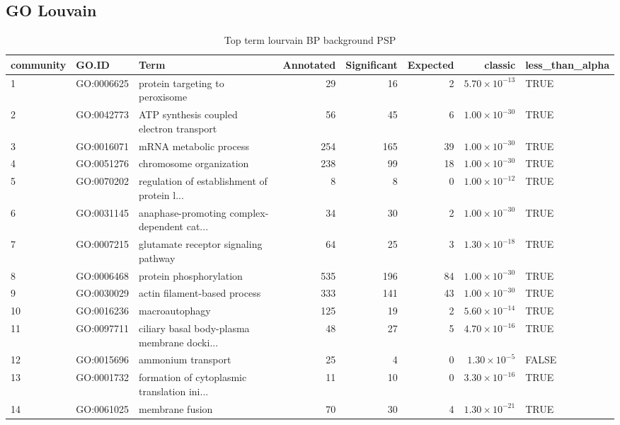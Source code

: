 \subsection{GO Louvain}
\begin{table}[ht]
\centering
\begin{adjustbox}{max width=\textwidth}
\begin{tabular}{lllrrrrl}
  \hline
community & GO.ID & Term & Annotated & Significant & Expected & classic & less\_than\_alpha \\ 
  \hline
1 & GO:0006625 & protein targeting to peroxisome & 29 & 16 & 2 & $5.70 \times 10^{-13}$ & TRUE \\ 
  2 & GO:0042773 & ATP synthesis coupled electron transport & 56 & 45 & 6 & $1.00 \times 10^{-30}$ & TRUE \\ 
  3 & GO:0016071 & mRNA metabolic process & 254 & 165 & 39 & $1.00 \times 10^{-30}$ & TRUE \\ 
  4 & GO:0051276 & chromosome organization & 238 & 99 & 18 & $1.00 \times 10^{-30}$ & TRUE \\ 
  5 & GO:0070202 & regulation of establishment of protein l... & 8 & 8 & 0 & $1.00 \times 10^{-12}$ & TRUE \\ 
  6 & GO:0031145 & anaphase-promoting complex-dependent cat... & 34 & 30 & 2 & $1.00 \times 10^{-30}$ & TRUE \\ 
  7 & GO:0007215 & glutamate receptor signaling pathway & 64 & 25 & 3 & $1.30 \times 10^{-18}$ & TRUE \\ 
  8 & GO:0006468 & protein phosphorylation & 535 & 196 & 84 & $1.00 \times 10^{-30}$ & TRUE \\ 
  9 & GO:0030029 & actin filament-based process & 333 & 141 & 43 & $1.00 \times 10^{-30}$ & TRUE \\ 
  10 & GO:0016236 & macroautophagy & 125 & 19 & 2 & $5.60 \times 10^{-14}$ & TRUE \\ 
  11 & GO:0097711 & ciliary basal body-plasma membrane docki... & 48 & 27 & 5 & $4.70 \times 10^{-16}$ & TRUE \\ 
  12 & GO:0015696 & ammonium transport & 25 & 4 & 0 & $1.30 \times 10^{-5}$ & FALSE \\ 
  13 & GO:0001732 & formation of cytoplasmic translation ini... & 11 & 10 & 0 & $3.30 \times 10^{-16}$ & TRUE \\ 
  14 & GO:0061025 & membrane fusion & 70 & 30 & 4 & $1.30 \times 10^{-21}$ & TRUE \\ 
   \hline
\end{tabular}
\end{adjustbox}
\caption{Top term  lourvain BP background PSP} 
\label{tab:Top term  lourvain BP background PSP}
\end{table}

